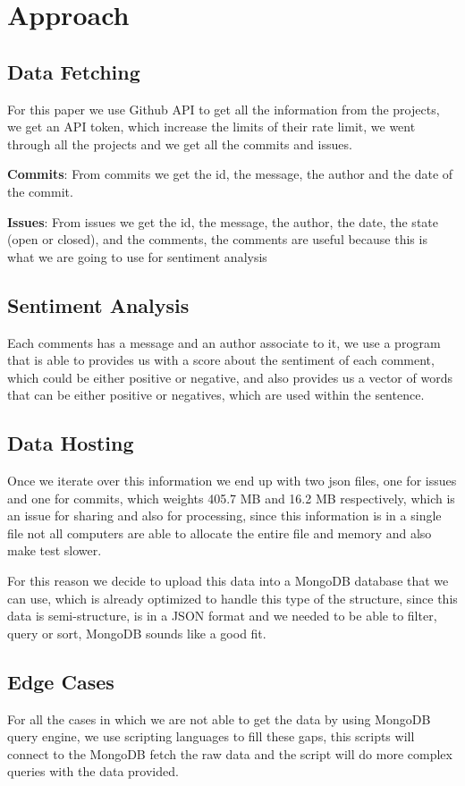 \section{Approach}
\subsection{Data Fetching}
For this paper we use Github API to get all the information from the projects, we get an API token, which increase the limits of their rate limit, we went through all the projects and we get all the commits and issues.

\textbf{Commits}: From commits we get the id, the message, the author and the date of the commit.


\textbf{Issues}: From issues we get the id, the message, the author, the date, the state (open or closed), and the comments, the comments are useful because this is what we are going to use for sentiment analysis
\subsection{Sentiment Analysis}
Each comments has a message and an author associate to it, we use a program that is able to provides us with a score about the sentiment of each comment, which could be either positive or negative, and also provides us a vector of words that can be either positive or negatives, which are used within the sentence.

\subsection{Data Hosting}
Once we iterate over this information we end up with two json files, one for issues and one for commits, which weights 405.7 MB and 16.2 MB respectively, which is an issue for sharing and also for processing, since this information is in a single file not all computers are able to allocate the entire file and memory and also make test slower.

For this reason we decide to upload this data into a MongoDB database that we can use, which is already optimized to handle this type of the structure, since this data is semi-structure, is in a JSON format and we needed to be able to filter, query or sort, MongoDB sounds like a good fit.

\subsection{Edge Cases}
For all the cases in which we are not able to get the data by using MongoDB query engine, we use scripting languages to fill these gaps, this scripts will connect to the MongoDB fetch the raw data and the script will do more complex queries with the data provided.